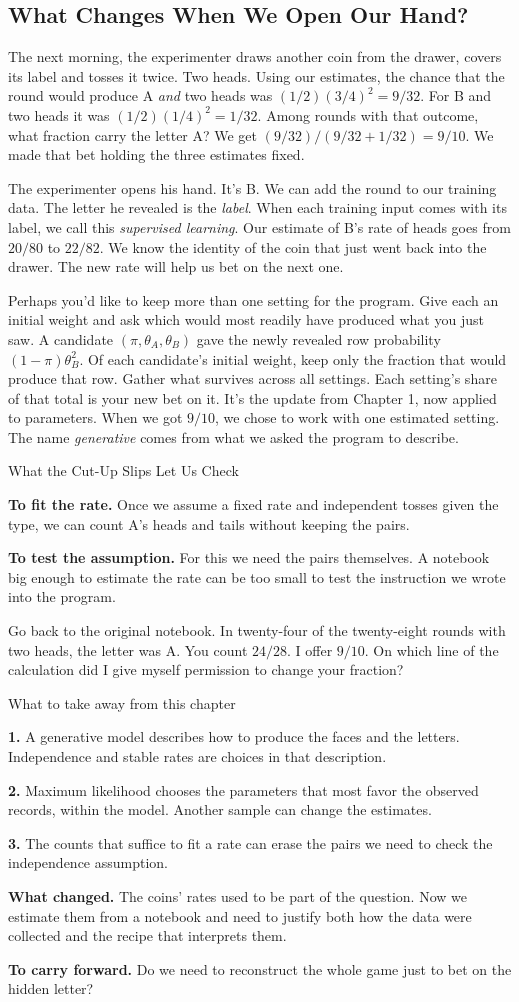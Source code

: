 \documentclass[12pt,oneside]{article}
\newcommand{\secao}[1]{\Needspace{5.2\baselineskip}\subsection*{#1}}
\newcommand{\itemq}[1]{\par\textbf{#1.}\enspace}
\begin{document}
\secao{What Changes When We Open Our Hand?}
The next morning, the experimenter draws another coin from the drawer, covers its label and tosses it twice. Two heads. Using our estimates, the chance that the round would produce A \emph{and} two heads was $(1/2)(3/4)^2=9/32$. For B and two heads it was $(1/2)(1/4)^2=1/32$. Among rounds with that outcome, what fraction carry the letter A? We get $(9/32)/(9/32+1/32)=9/10$. We made that bet holding the three estimates fixed.

The experimenter opens his hand. It's B. We can add the round to our training data. The letter he revealed is the \emph{label}. When each training input comes with its label, we call this \emph{supervised learning}. Our estimate of B's rate of heads goes from $20/80$ to $22/82$. We know the identity of the coin that just went back into the drawer. The new rate will help us bet on the next one.

Perhaps you'd like to keep more than one setting for the program. Give each an initial weight and ask which would most readily have produced what you just saw. A candidate $(\pi,\theta_A,\theta_B)$ gave the newly revealed row probability $(1-\pi)\theta_B^2$. Of each candidate's initial weight, keep only the fraction that would produce that row. Gather what survives across all settings. Each setting's share of that total is your new bet on it. It's the update from Chapter 1, now applied to parameters. When we got $9/10$, we chose to work with one estimated setting. The name \emph{generative} comes from what we asked the program to describe.

\begin{quadro}{What the Cut-Up Slips Let Us Check}
\itemq{To fit the rate} Once we assume a fixed rate and independent tosses given the type, we can count A's heads and tails without keeping the pairs.
\itemq{To test the assumption} For this we need the pairs themselves. A notebook big enough to estimate the rate can be too small to test the instruction we wrote into the program.
\end{quadro}

Go back to the original notebook. In twenty-four of the twenty-eight rounds with two heads, the letter was A. You count $24/28$. I offer $9/10$. On which line of the calculation did I give myself permission to change your fraction?

\begin{quadro}{What to take away from this chapter}
\itemq{1} A generative model describes how to produce the faces and the letters. Independence and stable rates are choices in that description.
\itemq{2} Maximum likelihood chooses the parameters that most favor the observed records, within the model. Another sample can change the estimates.
\itemq{3} The counts that suffice to fit a rate can erase the pairs we need to check the independence assumption.
\itemq{What changed} The coins' rates used to be part of the question. Now we estimate them from a notebook and need to justify both how the data were collected and the recipe that interprets them.
\itemq{To carry forward} Do we need to reconstruct the whole game just to bet on the hidden letter?
\end{quadro}
\end{document}
